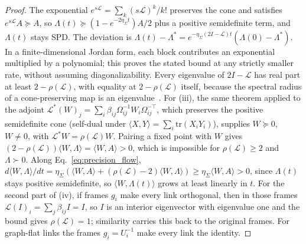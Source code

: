 \begin{proof}
The exponential $e^{s\mathcal{L}} = \sum_k (s\mathcal{L})^k/k!$ preserves the cone and satisfies $e^{s\mathcal{L}}A \succeq A$, so $\Lambda(t) \succeq (1 - e^{-2\eta_\Sigma t})A/2$ plus a positive semidefinite term, and $\Lambda(t)$ stays SPD. The deviation is $\Lambda(t)-\Lambda^*=e^{-\eta_\Sigma(2I-\mathcal L)t}(\Lambda(0)-\Lambda^*)$. In a finite-dimensional Jordan form, each block contributes an exponential multiplied by a polynomial; this proves the stated bound at any strictly smaller rate, without assuming diagonalizability. Every eigenvalue of $2I - \mathcal{L}$ has real part at least $2 - \rho(\mathcal{L})$, with equality at $2 - \rho(\mathcal{L})$ itself, because the spectral radius of a cone-preserving map is an eigenvalue~\cite{Vandergraft1968}. For (iii), the same theorem applied to the adjoint $\mathcal{L}^*(W)_j = \sum_i\beta_{ij}\Omega_{ij}^{-1}W_i\Omega_{ij}^{-\top}$, which preserves the positive semidefinite cone (self-dual under $\langle X, Y\rangle = \sum_i\mathrm{tr}(X_iY_i)$), supplies $W \succeq 0$, $W \neq 0$, with $\mathcal{L}^*W = \rho(\mathcal{L})W$. Pairing a fixed point with $W$ gives $(2 - \rho(\mathcal{L}))\langle W, \Lambda\rangle = \langle W, A\rangle > 0$, which is impossible for $\rho(\mathcal{L}) \geq 2$ and $\Lambda \succ 0$. Along Eq.~\eqref{eq:precision_flow}, $d\langle W, \Lambda\rangle/dt = \eta_\Sigma(\langle W, A\rangle + (\rho(\mathcal{L}) - 2)\langle W, \Lambda\rangle) \geq \eta_\Sigma\langle W, A\rangle > 0$, since $\Lambda(t)$ stays positive semidefinite, so $\langle W, \Lambda(t)\rangle$ grows at least linearly in $t$. For the second part of (iv), if frames $g_i$ make every link orthogonal, then in those frames $\mathcal{L}(I)_i = \sum_j\beta_{ij}I = I$, so $I$ is an interior eigenvector with eigenvalue one and the bound gives $\rho(\mathcal{L}) = 1$; similarity carries this back to the original frames. For graph-flat links the frames $g_i = U_i^{-1}$ make every link the identity.
\end{proof}

